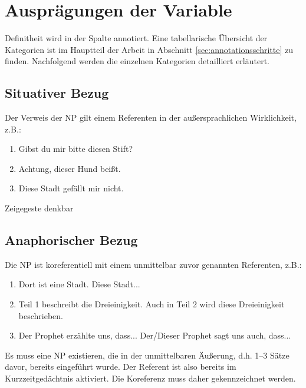 {\section{Ausprägungen der Variable } \label{sec:richtlinien-definitheit}
 
Definitheit wird in der Spalte  annotiert. Eine tabellarische Übersicht der Kategorien ist im Hauptteil der Arbeit in Abschnitt \ref{sec:annotationsschritte} zu finden. Nachfolgend werden die einzelnen Kategorien detailliert erläutert. 
 

\subsection{Situativer Bezug}

Der Verweis der NP gilt einem Referenten in der außersprachlichen Wirklichkeit, z.B.: 

\begin{enumerate}
\item Gibst du mir bitte diesen Stift? 
\item Achtung, dieser Hund beißt. 
\item Diese Stadt gefällt mir nicht.  
\end{enumerate}

\noindent 
{} Zeigegeste denkbar 

\subsection{Anaphorischer Bezug}

Die NP ist koreferentiell mit einem unmittelbar zuvor genannten Referenten, z.B.: 

\begin{enumerate}
\item Dort ist eine Stadt. Diese Stadt...
\item Teil 1 beschreibt die Dreieinigkeit. Auch in Teil 2 wird diese Dreieinigkeit beschrieben.
\item Der Prophet erzählte uns, dass... Der/Dieser Prophet sagt uns auch, dass...
\end{enumerate}

\noindent 
{} Es muss eine NP existieren, die in der unmittelbaren Äußerung, d.h. 1--3 Sätze davor, bereits eingeführt wurde. Der Referent ist also bereits im Kurzzeitgedächtnis aktiviert. Die Koreferenz muss daher gekennzeichnet werden. 

}
